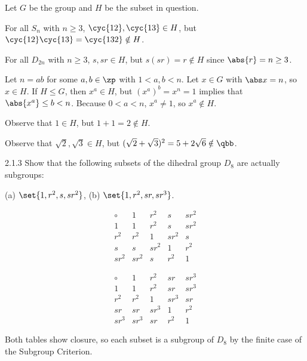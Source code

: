 \begin{sol}
    Let $G$ be the group and $H$ be the subset in question.
    \begin{subexercises}
        \item For all $S_n$ with $n \geq 3$, $\cyc{1 2}, \cyc{1 3} \in H$, but $\cyc{1 2}\cyc{1 3} = \cyc{1 3 2} \notin H$.
        \item For all $D_{2n}$ with $n \geq 3$, $s, sr \in H$, but $s(sr) = r \notin H$ since $\abs{r} = n \geq 3$.
        \item Let $n = ab$ for some $a, b \in \zp$ with $1 < a, b < n$.
	    Let $x \in G$ with $\abs x = n$, so $x \in H$.
	    If $H \leq G$, then $x^a \in H$, but $(x^a)^b = x^n = 1$ implies that $\abs{x^a} \leq b < n$.
        Because $0 < a < n$, $x^a \neq 1$, so $x^a \notin H$.
        \item Observe that $1 \in H$, but $1 + 1 = 2 \notin H$.
        \item Observe that $\sqrt 2, \sqrt 3 \in H$, but $(\sqrt 2 + \sqrt 3)^2 = 5 + 2\sqrt 6 \notin \qbb$. \qedhere
    \end{subexercises}
\end{sol}

\begin{exercise}{2.1.3}
    Show that the following subsets of the dihedral group $D_8$ are actually subgroups:
    
    (a) $\set{1, r^2, s, sr^2}$, \quad (b) $\set{1, r^2, sr, sr^3}$.
\end{exercise}

\begin{sol}
    \leavevmode
    \begin{subexercises}
        \item 
        \[
            \begin{array}{*{4}{c|}c}
                \circ & 1 & r^2 & s & sr^2 \\
                \hline
                1 & 1 & r^2 & s & sr^2 \\
                r^2 & r^2 & 1 & sr^2 & s \\
                s & s & sr^2 & 1 & r^2 \\
                sr^2 & sr^2 & s & r^2 & 1
            \end{array}
        \]
        \item 
        \[
            \begin{array}{*{4}{c|}c}
                \circ & 1 & r^2 & sr & sr^3 \\
                \hline
                1 & 1 & r^2 & sr & sr^3 \\
                r^2 & r^2 & 1 & sr^3 & sr \\
                sr & sr & sr^3 & 1 & r^2 \\
                sr^3 & sr^3 & sr & r^2 & 1
            \end{array}
        \]
    \end{subexercises}
    Both tables show closure, so each subset is a subgroup of $D_8$ by the finite case of the Subgroup Criterion.
\end{sol}

